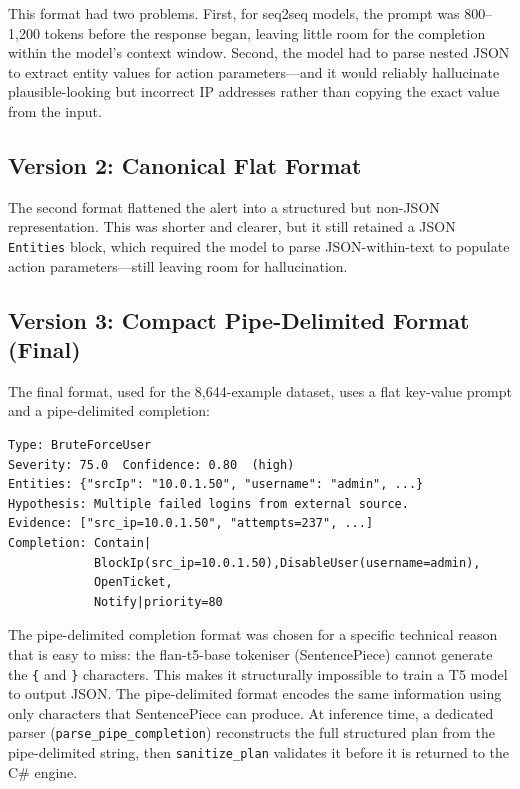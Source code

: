 This format had two problems. First, for seq2seq models, the prompt was 800--1,200 tokens before the response began, leaving little room for the completion within the model's context window. Second, the model had to parse nested JSON to extract entity values for action parameters---and it would reliably hallucinate plausible-looking but incorrect IP addresses rather than copying the exact value from the input.

\subsection{Version 2: Canonical Flat Format}

The second format flattened the alert into a structured but non-JSON representation. This was shorter and clearer, but it still retained a JSON \texttt{Entities} block, which required the model to parse JSON-within-text to populate action parameters---still leaving room for hallucination.

\subsection{Version 3: Compact Pipe-Delimited Format (Final)}

The final format, used for the 8,644-example dataset, uses a flat key-value prompt and a pipe-delimited completion:

\begin{verbatim}
Type: BruteForceUser
Severity: 75.0  Confidence: 0.80  (high)
Entities: {"srcIp": "10.0.1.50", "username": "admin", ...}
Hypothesis: Multiple failed logins from external source.
Evidence: ["src_ip=10.0.1.50", "attempts=237", ...]
Completion: Contain|
            BlockIp(src_ip=10.0.1.50),DisableUser(username=admin),
            OpenTicket,
            Notify|priority=80
\end{verbatim}

The pipe-delimited completion format was chosen for a specific technical reason that is easy to miss: the flan-t5-base tokeniser (SentencePiece) cannot generate the \texttt{\{} and \texttt{\}} characters. This makes it structurally impossible to train a T5 model to output JSON. The pipe-delimited format encodes the same information using only characters that SentencePiece can produce. At inference time, a dedicated parser (\texttt{parse\_pipe\_completion}) reconstructs the full structured plan from the pipe-delimited string, then \texttt{sanitize\_plan} validates it before it is returned to the C\# engine.


